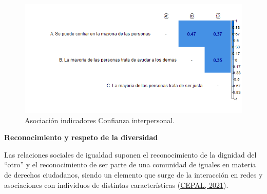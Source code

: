 \documentclass[
  12pt,
]{book}
\begin{document}
\begin{figure}[H]

{\centering \includegraphics[width=1\linewidth,height=1\textheight]{output/graphs/confianza-interpersonal_cor} 

}

\caption{Asociación indicadores Confianza interpersonal.}\label{fig:confianza-interpersonal-cor}
\end{figure}

\textbf{Reconocimiento y respeto de la diversidad}

Las relaciones sociales de igualdad suponen el reconocimiento de la dignidad del ``otro'' y el reconocimiento de ser parte de una comunidad de iguales en materia de derechos ciudadanos, siendo un elemento que surge de la interacción en redes y asociaciones con individuos de distintas características (\protect\hyperlink{ref-cepal_cohesion_2021}{CEPAL, 2021}).
\end{document}
